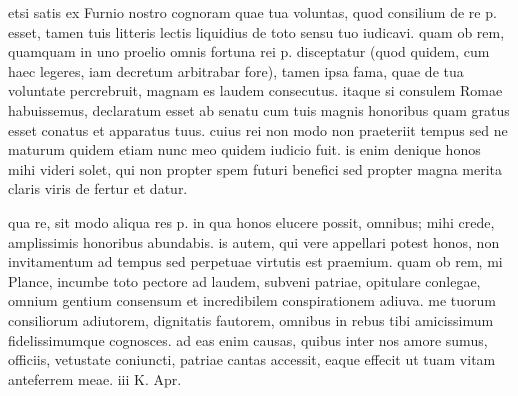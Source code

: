 


 etsi satis ex Furnio nostro cognoram quae tua voluntas, quod consilium de re p. esset, tamen tuis litteris lectis liquidius de toto sensu tuo iudicavi. quam ob rem, quamquam in uno proelio omnis fortuna rei p. disceptatur (quod quidem, cum haec legeres, iam decretum arbitrabar fore), tamen ipsa fama, quae de tua voluntate percrebruit, magnam es laudem consecutus. itaque si consulem Romae habuissemus, declaratum esset ab senatu cum tuis magnis honoribus quam gratus esset conatus et apparatus tuus. cuius rei non modo non praeteriit tempus sed ne maturum quidem etiam nunc meo quidem iudicio fuit. is enim denique honos mihi videri solet, qui non propter spem futuri benefici sed propter magna merita claris viris de fertur et datur.

 qua re, sit modo aliqua res p. in qua honos elucere possit, omnibus; mihi crede, amplissimis honoribus abundabis. is autem, qui vere appellari potest honos, non invitamentum ad tempus sed perpetuae virtutis est praemium. quam ob rem, mi Plance, incumbe toto pectore ad laudem, subveni patriae, opitulare conlegae, omnium gentium consensum et incredibilem conspirationem adiuva. me tuorum consiliorum adiutorem, dignitatis fautorem, omnibus in rebus tibi amicissimum fidelissimumque cognosces. ad eas enim causas, quibus inter nos amore sumus, officiis, vetustate coniuncti, patriae cantas accessit, eaque effecit ut tuam vitam anteferrem meae. iii K. Apr.
